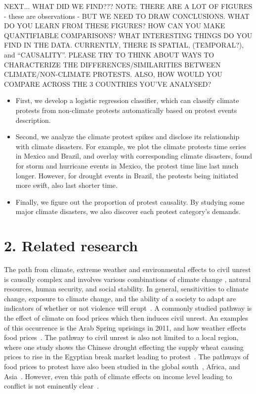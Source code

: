 \documentclass[9pt,twocolumn,twoside]{pnas-new}
\begin{document}
NEXT... WHAT DID WE FIND???
{\color{red}
NOTE: THERE ARE A LOT OF FIGURES - these are observations - BUT WE NEED TO DRAW CONCLUSIONS. WHAT DO YOU LEARN FROM THESE FIGURES? HOW CAN YOU MAKE QUANTIFIABLE COMPARISONS? WHAT INTERESTING THINGS DO YOU FIND IN THE DATA. CURRENTLY, THERE IS SPATIAL, (TEMPORAL?), and ``CAUSALITY''. PLEASE TRY TO THINK ABOUT WAYS TO CHARACTERIZE THE DIFFERENCES/SIMILARITIES BETWEEN CLIMATE/NON-CLIMATE PROTESTS. ALSO, HOW WOULD YOU COMPARE ACROSS THE 3 COUNTRIES YOU'VE ANALYSED?}

\begin{itemize}
  \item First, we develop a logistic regression classifier, which can classify climate protests from non-climate protests automatically based on protest events description.
  \item Second, we analyze the climate protest spikes and disclose its relationship with climate disasters. For example, we plot the climate protests time series in Mexico and Brazil, and overlay with corresponding climate disasters, found for storm and hurricane events in Mexico, the protest time line last much longer. However, for drought events in Brazil, the protests being initiated more swift, also last shorter time.
  \item Finally, we figure out the proportion of protest causality. By studying some major climate disasters, we also discover each protest category's demands.
\end{itemize}
%

%

%
%
\section{2. Related research}
The path from climate, extreme weather and environmental effects to civil unrest is causally complex \cite{hsiang2011civil,RW5} and involves various combinations of climate change \cite{burke2014climate}, natural resources, human security, and social stability.
In general, sensitivities to climate change, exposure to climate change, and the ability of a society to adapt are indicators of whether or not violence will erupt~\cite{RW9}.
A commonly studied pathway is the effect of climate on food prices which then induces civil unrest.
An examples of this occurrence is the Arab Spring uprisings in 2011, and how weather effects food prices~\cite{RW2}.
The pathway to civil unrest is also not limited to a local region, where one study shows the Chinese drought effecting the supply wheat causing prices to rise in the Egyptian break market leading to protest~\cite{RW1}.
The pathways of food prices to protest have also been studied in the global south~\cite{RW4}, Africa, and Asia~\cite{wischnath2014climate,RW6}.
However, even this path of climate effects on income level leading to conflict is not eminently clear~\cite{RW10}.
\end{document}

